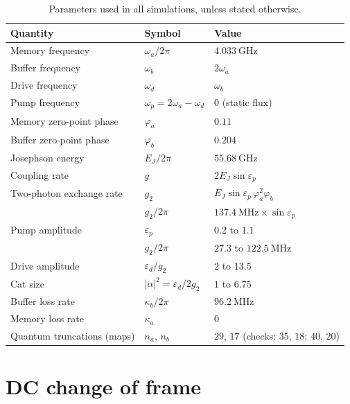 \documentclass[aps,prx,reprint,floatfix,amsmath,amssymb,longbibliography]{revtex4-2}
\newcommand{\eps}{\varepsilon}
\begin{document}
\begin{table}[h]
    \centering
    \caption{Parameters used in all simulations, unless stated otherwise.}
    \label{tab:parameters}
    \begin{tabular}{lll}
        \toprule
        Quantity & Symbol & Value \\
        \midrule
        Memory frequency & $\omega_a/2\pi$ & $4.033~\mathrm{GHz}$ \\
        Buffer frequency & $\omega_b$ & $2\omega_a$ \\
        Drive frequency & $\omega_d$ & $\omega_b$ \\
        Pump frequency & $\omega_p=2\omega_a-\omega_d$ & $0$ (static flux) \\
        Memory zero-point phase & $\varphi_a$ & $0.11$ \\
        Buffer zero-point phase & $\varphi_b$ & $0.204$ \\
        Josephson energy & $E_J/2\pi$ & $55.68~\mathrm{GHz}$ \\
        Coupling rate & $g$ & $2E_J\sin\eps_p$ \\
        Two-photon exchange rate & $g_2$ & $E_J\sin\eps_p\,\varphi_a^2\varphi_b$ \\
         & $g_2/2\pi$ & $137.4~\mathrm{MHz}\times\sin\eps_p$ \\
        Pump amplitude & $\eps_p$ & $0.2$ to $1.1$ \\
         & $g_2/2\pi$ & $27.3$ to $122.5~\mathrm{MHz}$ \\
        Drive amplitude & $\eps_d/g_2$ & $2$ to $13.5$ \\
        Cat size & $|\alpha|^2=\eps_d/2g_2$ & $1$ to $6.75$ \\
        Buffer loss rate & $\kappa_b/2\pi$ & $96.2~\mathrm{MHz}$ \\
        Memory loss rate & $\kappa_a$ & $0$ \\
        Quantum truncations (maps) & $n_a$, $n_b$ & $29$, $17$ (checks: $35$, $18$; $40$, $20$) \\
        \bottomrule
    \end{tabular}
\end{table}

\section{DC change of frame}
\label{app:dc_frame}
\end{document}
